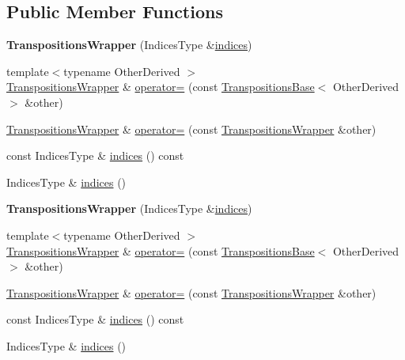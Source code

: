 \subsection*{Public Member Functions}
\begin{DoxyCompactItemize}
\item 
\mbox{\label{class_eigen_1_1_transpositions_wrapper_a61f69c978853a6a3979180cb1f83032c}} 
{\bfseries Transpositions\+Wrapper} (Indices\+Type \&\hyperlink{class_eigen_1_1_transpositions_wrapper_a5a64081fa7eaa0b02ec10c548505899d}{indices})
\item 
{\footnotesize template$<$typename Other\+Derived $>$ }\\\hyperlink{class_eigen_1_1_transpositions_wrapper}{Transpositions\+Wrapper} \& \hyperlink{class_eigen_1_1_transpositions_wrapper_ac4e1956279759cbda2c9f2784197cfe9}{operator=} (const \hyperlink{class_eigen_1_1_transpositions_base}{Transpositions\+Base}$<$ Other\+Derived $>$ \&other)
\item 
\hyperlink{class_eigen_1_1_transpositions_wrapper}{Transpositions\+Wrapper} \& \hyperlink{class_eigen_1_1_transpositions_wrapper_acb74132efbe10876525cdc3d35c2d382}{operator=} (const \hyperlink{class_eigen_1_1_transpositions_wrapper}{Transpositions\+Wrapper} \&other)
\item 
const Indices\+Type \& \hyperlink{class_eigen_1_1_transpositions_wrapper_a5a64081fa7eaa0b02ec10c548505899d}{indices} () const
\item 
Indices\+Type \& \hyperlink{class_eigen_1_1_transpositions_wrapper_aab0aee4242436a7223fea797a1fa8ee9}{indices} ()
\item 
\mbox{\label{class_eigen_1_1_transpositions_wrapper_a61f69c978853a6a3979180cb1f83032c}} 
{\bfseries Transpositions\+Wrapper} (Indices\+Type \&\hyperlink{class_eigen_1_1_transpositions_wrapper_a5a64081fa7eaa0b02ec10c548505899d}{indices})
\item 
{\footnotesize template$<$typename Other\+Derived $>$ }\\\hyperlink{class_eigen_1_1_transpositions_wrapper}{Transpositions\+Wrapper} \& \hyperlink{class_eigen_1_1_transpositions_wrapper_ac4e1956279759cbda2c9f2784197cfe9}{operator=} (const \hyperlink{class_eigen_1_1_transpositions_base}{Transpositions\+Base}$<$ Other\+Derived $>$ \&other)
\item 
\hyperlink{class_eigen_1_1_transpositions_wrapper}{Transpositions\+Wrapper} \& \hyperlink{class_eigen_1_1_transpositions_wrapper_acb74132efbe10876525cdc3d35c2d382}{operator=} (const \hyperlink{class_eigen_1_1_transpositions_wrapper}{Transpositions\+Wrapper} \&other)
\item 
const Indices\+Type \& \hyperlink{class_eigen_1_1_transpositions_wrapper_a5a64081fa7eaa0b02ec10c548505899d}{indices} () const
\item 
Indices\+Type \& \hyperlink{class_eigen_1_1_transpositions_wrapper_aab0aee4242436a7223fea797a1fa8ee9}{indices} ()
\end{DoxyCompactItemize}
